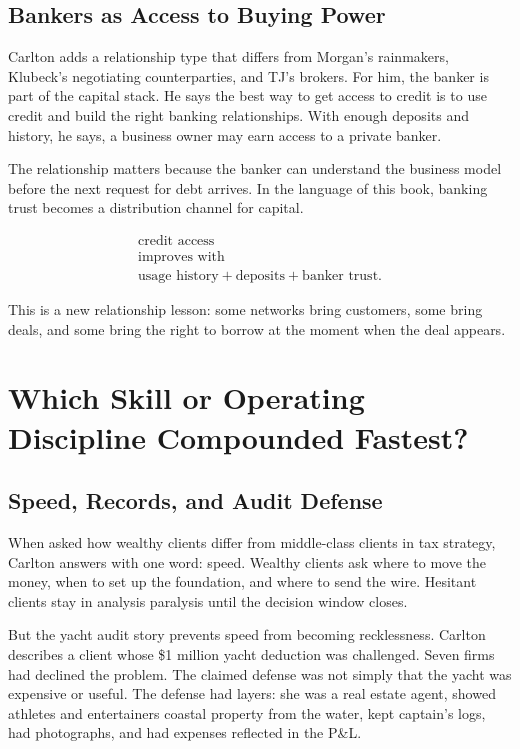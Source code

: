 \documentclass[11pt,oneside]{book}
\begin{document}
\section{Bankers as Access to Buying Power}

Carlton adds a relationship type that differs from Morgan's rainmakers, Klubeck's negotiating counterparties, and TJ's brokers. For him, the banker is part of the capital stack. He says the best way to get access to credit is to use credit and build the right banking relationships. With enough deposits and history, he says, a business owner may earn access to a private banker.

The relationship matters because the banker can understand the business model before the next request for debt arrives. In the language of this book, banking trust becomes a distribution channel for capital.

\begin{equation}
\begin{gathered}
\text{credit access}\\
\text{improves with}\\
\text{usage history}+\text{deposits}+\text{banker trust}.
\end{gathered}
\end{equation}

This is a new relationship lesson: some networks bring customers, some bring deals, and some bring the right to borrow at the moment when the deal appears.

\chapter{Which Skill or Operating Discipline Compounded Fastest?}

\section{Speed, Records, and Audit Defense}

When asked how wealthy clients differ from middle-class clients in tax strategy, Carlton answers with one word: speed. Wealthy clients ask where to move the money, when to set up the foundation, and where to send the wire. Hesitant clients stay in analysis paralysis until the decision window closes.

But the yacht audit story prevents speed from becoming recklessness. Carlton describes a client whose \$1 million yacht deduction was challenged. Seven firms had declined the problem. The claimed defense was not simply that the yacht was expensive or useful. The defense had layers: she was a real estate agent, showed athletes and entertainers coastal property from the water, kept captain's logs, had photographs, and had expenses reflected in the P\&L.
\end{document}
